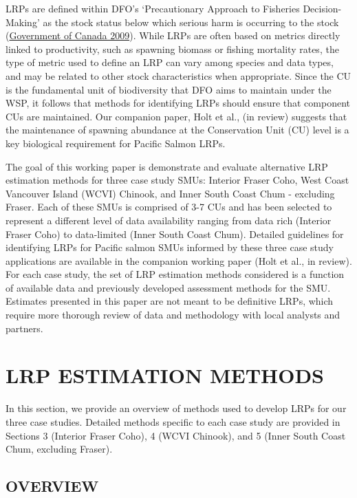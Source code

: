 \documentclass[11pt]{book}
\begin{document}
LRPs are defined within DFO's `Precautionary Approach to Fisheries Decision-Making' as the stock status below which serious harm is occurring to the stock (\protect\hyperlink{ref-governmentofcanadaFisheryDecisionmakingFramework2009}{Government of Canada 2009}). While LRPs are often based on metrics directly linked to productivity, such as spawning biomass or fishing mortality rates, the type of metric used to define an LRP can vary among species and data types, and may be related to other stock characteristics when appropriate. Since the CU is the fundamental unit of biodiversity that DFO aims to maintain under the WSP, it follows that methods for identifying LRPs should ensure that component CUs are maintained. Our companion paper, Holt et al., (in review) suggests that the maintenance of spawning abundance at the Conservation Unit (CU) level is a key biological requirement for Pacific Salmon LRPs.

The goal of this working paper is demonstrate and evaluate alternative LRP estimation methods for three case study SMUs: Interior Fraser Coho, West Coast Vancouver Island (WCVI) Chinook, and Inner South Coast Chum - excluding Fraser. Each of these SMUs is comprised of 3-7 CUs and has been selected to represent a different level of data availability ranging from data rich (Interior Fraser Coho) to data-limited (Inner South Coast Chum). Detailed guidelines for identifying LRPs for Pacific salmon SMUs informed by these three case study applications are available in the companion working paper (Holt et al., in review). For each case study, the set of LRP estimation methods considered is a function of available data and previously developed assessment methods for the SMU. Estimates presented in this paper are not meant to be definitive LRPs, which require more thorough review of data and methodology with local analysts and partners.

\hypertarget{MethodsChapter}{%
\section{LRP ESTIMATION METHODS}\label{MethodsChapter}}

In this section, we provide an overview of methods used to develop LRPs for our three case studies. Detailed methods specific to each case study are provided in Sections 3 (Interior Fraser Coho), 4 (WCVI Chinook), and 5 (Inner South Coast Chum, excluding Fraser).

\hypertarget{overview}{%
\subsection{OVERVIEW}\label{overview}}
\end{document}
